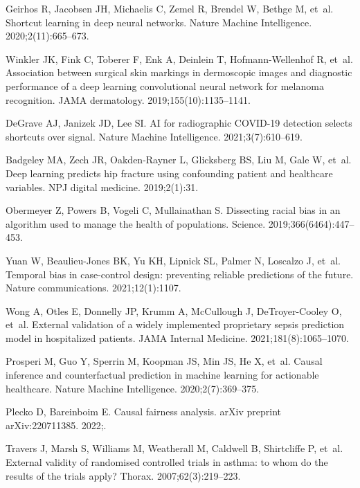 \documentclass[10pt,letterpaper]{article}
\begin{document}
\begin{thebibliography}{100}
  Geirhos R, Jacobsen JH, Michaelis C, Zemel R, Brendel W, Bethge M, et~al.
  \newblock Shortcut learning in deep neural networks.
  \newblock Nature Machine Intelligence. 2020;2(11):665--673.

  Winkler JK, Fink C, Toberer F, Enk A, Deinlein T, Hofmann-Wellenhof R, et~al.
  \newblock Association between surgical skin markings in dermoscopic images and diagnostic performance of a deep learning convolutional neural network for melanoma recognition.
  \newblock JAMA dermatology. 2019;155(10):1135--1141.

  DeGrave AJ, Janizek JD, Lee SI.
  \newblock AI for radiographic COVID-19 detection selects shortcuts over signal.
  \newblock Nature Machine Intelligence. 2021;3(7):610--619.

  Badgeley MA, Zech JR, Oakden-Rayner L, Glicksberg BS, Liu M, Gale W, et~al.
  \newblock Deep learning predicts hip fracture using confounding patient and healthcare variables.
  \newblock NPJ digital medicine. 2019;2(1):31.

  Obermeyer Z, Powers B, Vogeli C, Mullainathan S.
  \newblock Dissecting racial bias in an algorithm used to manage the health of populations.
  \newblock Science. 2019;366(6464):447--453.

  Yuan W, Beaulieu-Jones BK, Yu KH, Lipnick SL, Palmer N, Loscalzo J, et~al.
  \newblock Temporal bias in case-control design: preventing reliable predictions of the future.
  \newblock Nature communications. 2021;12(1):1107.

  Wong A, Otles E, Donnelly JP, Krumm A, McCullough J, DeTroyer-Cooley O, et~al.
  \newblock External validation of a widely implemented proprietary sepsis prediction model in hospitalized patients.
  \newblock JAMA Internal Medicine. 2021;181(8):1065--1070.

  Prosperi M, Guo Y, Sperrin M, Koopman JS, Min JS, He X, et~al.
  \newblock Causal inference and counterfactual prediction in machine learning for actionable healthcare.
  \newblock Nature Machine Intelligence. 2020;2(7):369--375.

  Plecko D, Bareinboim E.
  \newblock Causal fairness analysis.
  \newblock arXiv preprint arXiv:220711385. 2022;.

  Travers J, Marsh S, Williams M, Weatherall M, Caldwell B, Shirtcliffe P, et~al.
  \newblock External validity of randomised controlled trials in asthma: to whom do the results of the trials apply?
  \newblock Thorax. 2007;62(3):219--223.


\end{thebibliography}
\end{document}
